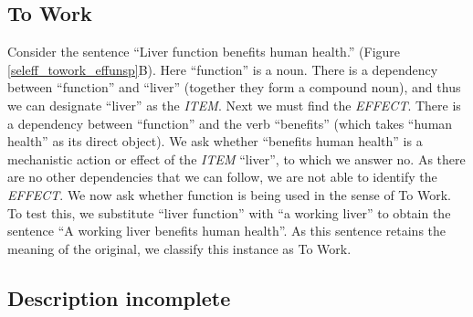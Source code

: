 \documentclass{article}
\begin{document}
\subsection{To Work}
\label{sec:work}

Consider the sentence ``Liver function benefits human health.'' (Figure \ref{seleff_towork_effunsp}B).
Here ``function'' is a noun.
There is a dependency between ``function'' and ``liver'' (together they form a compound noun), and thus we can designate ``liver'' as the \emph{ITEM}.
Next we must find the \emph{EFFECT}.
There is a dependency between ``function'' and the verb ``benefits'' (which takes ``human health'' as its direct object).
We ask whether ``benefits human health'' is a mechanistic action or effect of the \emph{ITEM} ``liver'', to which we answer no.
As there are no other dependencies that we can follow, we are not able to identify the \emph{EFFECT}.
We now ask whether function is being used in the sense of To Work.
To test this, we substitute ``liver function'' with ``a working liver'' to obtain the sentence ``A working liver benefits human health''.
As this sentence retains the meaning of the original, we classify this instance as To Work.

\subsection{Description incomplete}
\label{sec:descr-incompl}
\end{document}
